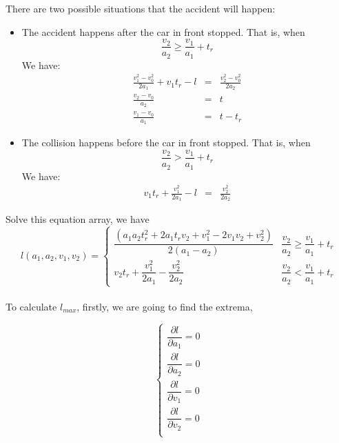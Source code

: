 There are two possible situations that the accident will happen:
\begin{itemize}
\item The accident happens after the car in front stopped.
That is, when
\begin{displaymath}
\frac{v_2}{a_2}  \geq  \frac{v_1}{a_1} + t_r
\end{displaymath}
We have:
\begin{eqnarray}
\frac{v_1^2 - v_0 ^ 2}{2a_1} + v_1 t_r - l & = & \frac{v_2 ^ 2 - v_0 ^ 2}{2a_2}\\
\frac{v_2 - v_0}{a_2} & = & t\\
\frac{v_1 - v_0}{a_1} & = & t - t_r
\end{eqnarray}
\item The collision happens before the car in front stopped. That is, when
\begin{displaymath}
\frac{v_2}{a_2}  >  \frac{v_1}{a_1} + t_r
\end{displaymath}
We have:
\begin{eqnarray}
v_1 t_r + \frac{v_1 ^ 2}{2a_1} - l& = &\frac{v_2^2}{2a_2}
\end{eqnarray}
\end{itemize}

Solve this equation array, we have
\begin{displaymath}
l(a_1, a_2, v_1, v_2) = 
\left \{
\begin{array}{cl}
\dfrac{(a_1a_2t_r^2 + 2a_1t_rv_2 + v_1^2 - 2v_1v_2 + v_2^2)}{2(a_1-a_2)} & \dfrac{v_2}{a_2}  \geq \dfrac{v_1}{a_1} + t_r \\
v_2 t_r + \dfrac{v_1 ^ 2}{2a_1} -\dfrac{v_2^2}{2a_2} & \dfrac{v_2}{a_2}  < \dfrac{v_1}{a_1} + t_r
\end{array}
\right .
\end{displaymath}
\\

To calculate $l_{max}$, firstly, we are going to find the extrema,

\begin{displaymath}
\left \{
\begin{array}{cl}
\dfrac{\partial l}{\partial{a_1}} = 0 \\
\dfrac{\partial l}{\partial{a_2}} = 0 \\
\dfrac{\partial l}{\partial{v_1}} = 0 \\
\dfrac{\partial l}{\partial{v_2}} = 0 \\
\end{array}
\right .
\end{displaymath}

